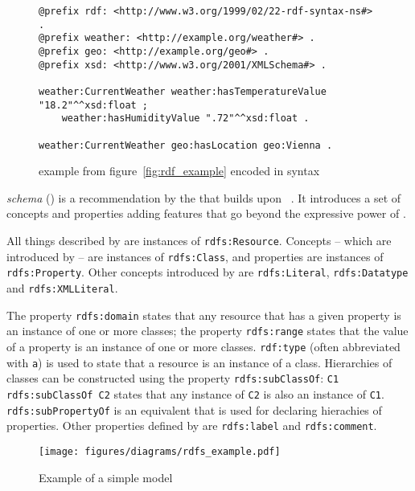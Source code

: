 \begin{figure}
\begin{lstlisting}
@prefix rdf: <http://www.w3.org/1999/02/22-rdf-syntax-ns#> .
@prefix weather: <http://example.org/weather#> .
@prefix geo: <http://example.org/geo#> .
@prefix xsd: <http://www.w3.org/2001/XMLSchema#> .

weather:CurrentWeather weather:hasTemperatureValue "18.2"^^xsd:float ;
    weather:hasHumidityValue ".72"^^xsd:float .

weather:CurrentWeather geo:hasLocation geo:Vienna .
\end{lstlisting}
\caption{ example from figure~\ref{fig:rdf_example} encoded in  syntax}
\label{fig:turtle_example}
\end{figure}

\vspace{1em}

 \emph{schema} () is a recommendation by the  that builds upon ~\cite{RDFS}. It introduces a set of concepts and properties adding features that go beyond the expressive power of .

All things described by  are instances of \texttt{rdfs:Resource}. Concepts -- which are introduced by  -- are instances of \texttt{rdfs:Class}, and properties are instances of \texttt{rdfs:\hspace{0pt}Property}. Other concepts introduced by  are \texttt{rdfs:\hspace{0pt}Literal}, \texttt{rdfs:\hspace{0pt}Datatype} and \texttt{rdfs:\hspace{0pt}XMLLiteral}.

The property \texttt{rdfs:domain} states that any resource that has a given property is an instance of one or more classes; the property \texttt{rdfs:range} states that the value of a property is an instance of one or more classes. \texttt{rdf:type} (often abbreviated with \texttt{a}) is used to state that a resource is an instance of a class. Hierarchies of classes can be constructed using the property \texttt{rdfs:subClassOf}: \texttt{C1 rdfs:subClassOf C2} states that any instance of \texttt{C2} is also an instance of \texttt{C1}. \texttt{rdfs:subPropertyOf} is an equivalent that is used for declaring hierachies of properties. Other properties defined by  are \texttt{rdfs:label} and \texttt{rdfs:comment}.

\begin{figure}
\centering
\texttt{[image: figures/diagrams/rdfs\_example.pdf]}
\caption{Example of a simple  model}
\label{fig:rdfs_example}
\end{figure}

